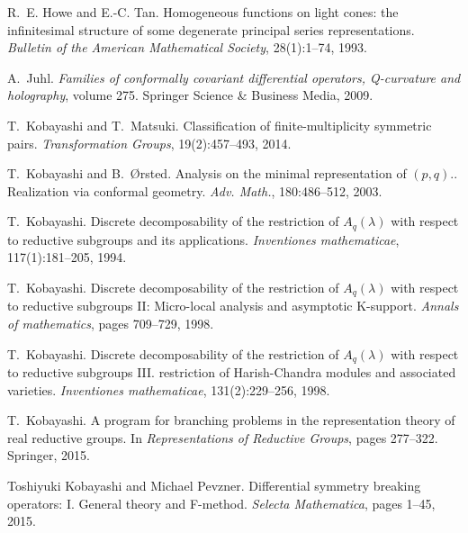 \documentclass{article}
\newcommand{\tmtextit}[1]{{\itshape{#1}}}
\newcommand{\tmtextrm}[1]{{\rmfamily{#1}}}
\numberwithin{definition}{section}
\numberwithin{lemma}{section}
\numberwithin{proposition}{section}
{\theorembodyfont{\rmfamily}\newtheorem{remark}{Remark}
\numberwithin{remark}{section}
}
\begin{document}
\begin{thebibliography}{CK{\O}P11}
  R.~E. Howe and E.-C. Tan.
  {\newblock}Homogeneous functions on light cones: the infinitesimal structure
  of some degenerate principal series representations.
  {\newblock}\tmtextit{Bulletin of the American Mathematical Society},
  28(1):1--74, 1993.
  
  A.~Juhl. {\newblock}\tmtextit{Families of
  conformally covariant differential operators, Q-curvature and holography},
  volume 275. {\newblock}Springer Science \& Business Media, 2009.
  
  T.~Kobayashi and T.~Matsuki.
  {\newblock}Classification of finite-multiplicity symmetric pairs.
  {\newblock}\tmtextit{Transformation Groups}, 19(2):457--493, 2014.
  
  T.~Kobayashi and B.~{\O}rsted. {\newblock}Analysis on
  the minimal representation of \tmtextrm{O}$(p, q)$.\tmtextrm{I}. Realization
  via conformal geometry. {\newblock}\tmtextit{Adv. Math.}, 180:486--512,
  2003.
  
  T.~Kobayashi. {\newblock}Discrete
  decomposability of the restriction of $A_q (\lambda)$ with respect to
  reductive subgroups and its applications. {\newblock}\tmtextit{Inventiones
  mathematicae}, 117(1):181--205, 1994.
  
  T.~Kobayashi. {\newblock}Discrete
  decomposability of the restriction of $A_q (\lambda)$ with respect to
  reductive subgroups II: Micro-local analysis and asymptotic K-support.
  {\newblock}\tmtextit{Annals of mathematics}, pages 709--729, 1998.
  
  T.~Kobayashi. {\newblock}Discrete
  decomposability of the restriction of $A_q (\lambda)$ with respect to
  reductive subgroups III. restriction of Harish-Chandra modules and
  associated varieties. {\newblock}\tmtextit{Inventiones mathematicae},
  131(2):229--256, 1998.
  
  T.~Kobayashi. {\newblock}A program for
  branching problems in the representation theory of real reductive groups.
  {\newblock}In \tmtextit{Representations of Reductive Groups}, pages
  277--322. Springer, 2015.
  
  Toshiyuki Kobayashi and Michael
  Pevzner. {\newblock}Differential symmetry breaking operators: I. General
  theory and F-method. {\newblock}\tmtextit{Selecta Mathematica}, pages 1--45,
  2015.
  

\end{thebibliography}
\end{document}
